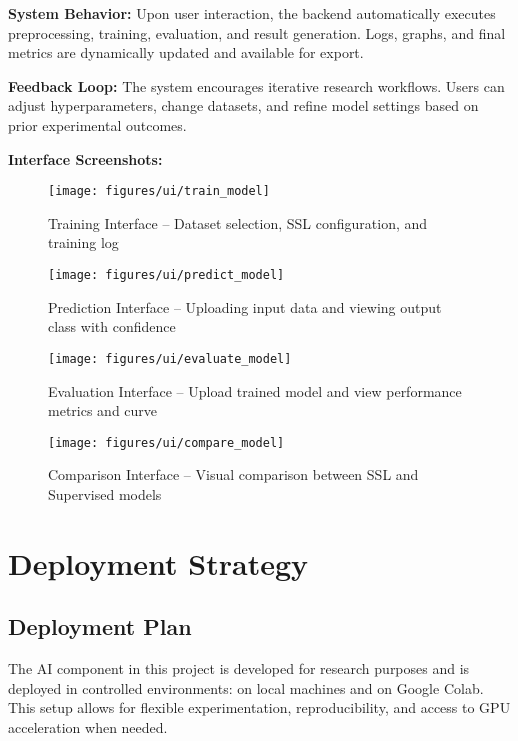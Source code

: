 \vspace{1em}
\noindent\textbf{System Behavior:}
Upon user interaction, the backend automatically executes preprocessing, training, evaluation, and result generation.
Logs, graphs, and final metrics are dynamically updated and available for export.

\vspace{1em}
\noindent\textbf{Feedback Loop:}
The system encourages iterative research workflows.
Users can adjust hyperparameters, change datasets, and refine model settings based on prior experimental outcomes.

\noindent\textbf{Interface Screenshots:}

\begin{figure}[H]
    \centering
    \texttt{[image: figures/ui/train\_model]}
    \caption{Training Interface – Dataset selection, SSL configuration, and training log}
    \label{fig:ui_train_model}
\end{figure}

\begin{figure}[H]
    \centering
    \texttt{[image: figures/ui/predict\_model]}
    \caption{Prediction Interface – Uploading input data and viewing output class with confidence}
    \label{fig:ui_predict_model}
\end{figure}

\begin{figure}[H]
    \centering
    \texttt{[image: figures/ui/evaluate\_model]}
    \caption{Evaluation Interface – Upload trained model and view performance metrics and curve}
    \label{fig:ui_evaluate_model}
\end{figure}

\begin{figure}[H]
    \centering
    \texttt{[image: figures/ui/compare\_model]}
    \caption{Comparison Interface – Visual comparison between SSL and Supervised models}
    \label{fig:ui_compare_mode}
\end{figure}

\FloatBarrier


\section{Deployment Strategy}
\label{sec:deployment-strategy}

\subsection{Deployment Plan}
\label{subsec:deployment-plan}
The AI component in this project is developed for research purposes and is deployed in controlled environments: on local machines and on Google Colab.
This setup allows for flexible experimentation, reproducibility, and access to GPU acceleration when needed.

